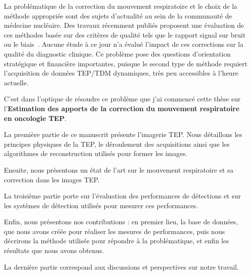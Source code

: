 La problématique de la correction du mouvement respiratoire et le choix de la méthode appropriée sont des sujets d’actualité au sein de la communauté de médecine nucléaire. Des travaux récemment publiés proposent une évaluation de ces méthodes basée sur des critères de qualité tels que le rapport signal sur bruit ou le biais~\cite{visvikis2004evaluation}. Aucune étude à ce jour n’a évalué l’impact de ces corrections sur la qualité du diagnostic clinique. Ce problème pose des questions d’orientation stratégique et financière importantes, puisque le second type de méthode requiert l’acquisition de données TEP/TDM dynamiques, très peu accessibles à l’heure actuelle.

C'est dans l'optique de résoudre ce problème que j'ai commencé cette thèse sur l'\textbf{Estimation des apports de la correction du mouvement respiratoire en oncologie TEP}.



La première partie de ce manuscrit présente l'imagerie TEP. Nous détaillons les principes physiques de la TEP, le déroulement des acquisitions ainsi que les algorithmes de reconstruction utilisés pour former les images.

Ensuite, nous présentons un état de l'art sur le mouvement respiratoire et sa correction dans les images TEP.

La troisième partie porte sur l'évaluation des performances de détections et sur les systèmes de détection utilisés pour mesurer ces performances.

Enfin, nous présentons nos contributions : en premier lieu, la base de données, que nous avons créée pour réaliser les mesures de performances, puis nous décrirons la méthode utilisée pour répondre à la problématique, et enfin les résultats que nous avons obtenus.



La dernière partie correspond aux discussions et perspectives sur notre travail.